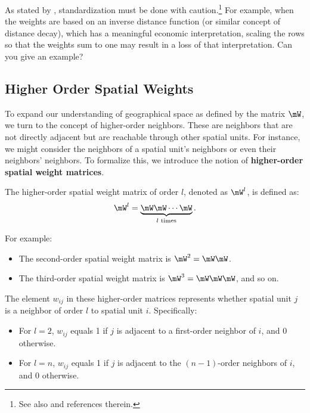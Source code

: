 \documentclass[english,12pt]{book}\usepackage[]{graphicx}\usepackage[]{xcolor}
\begin{document}
\begin{remark}
As stated by \citet[][p. 23-24]{anselin1988spatial}, standardization must be done with caution.\footnote{See also \citet[][p. 12]{elhorst2014spatial} and references therein.} For example, when the weights are based on an inverse distance function (or similar concept of distance decay), which has a meaningful economic interpretation, scaling the rows so that the weights sum to one may result in a loss of that interpretation. Can you give an example?
\end{remark}


\subsection{Higher Order Spatial Weights}\label{sec:HSO}

To expand our understanding of geographical space as defined by the matrix $\mW$, we turn to the concept of higher-order neighbors. These are neighbors that are not directly adjacent but are reachable through other spatial units. For instance, we might consider the neighbors of a spatial unit's neighbors or even their neighbors' neighbors. To formalize this, we introduce the notion of \textbf{higher-order spatial weight matrices}.

The higher-order spatial weight matrix of order $l$, denoted as $\mW^l$, is defined as:
\begin{equation*}
  \mW^l = \underbrace{\mW \mW \cdots \mW}_{l \text{ times}}.
\end{equation*}

For example:
\begin{itemize}
\item The second-order spatial weight matrix is $\mW^2 = \mW\mW$.
\item The third-order spatial weight matrix is $\mW^3 = \mW \mW\mW$, and so on.
\end{itemize}

The element $w_{ij}$ in these higher-order matrices represents whether spatial unit $j$ is a neighbor of order $l$ to spatial unit $i$. Specifically:
\begin{itemize}
\item For $l = 2$, $w_{ij}$ equals 1 if $j$ is adjacent to a first-order neighbor of $i$, and 0 otherwise.
\item For $l = n$, $w_{ij}$ equals 1 if $j$ is adjacent to the $(n-1)$-order neighbors of $i$, and 0 otherwise.
\end{itemize}
\end{document}

